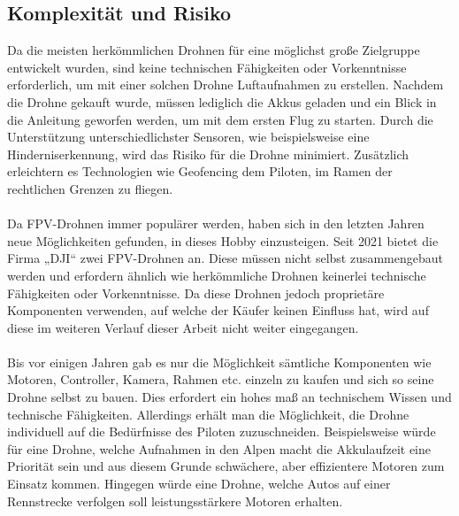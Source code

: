 \subsection[Komplexität und Risiko]{Komplexität und Risiko}
    Da die meisten herkömmlichen Drohnen für eine möglichst große Zielgruppe entwickelt wurden, sind keine technischen Fähigkeiten oder Vorkenntnisse erforderlich, um mit einer solchen Drohne Luftaufnahmen zu erstellen. Nachdem die Drohne gekauft wurde, müssen lediglich die Akkus geladen und ein Blick in die Anleitung geworfen werden, um mit dem ersten Flug zu starten. Durch die Unterstützung unterschiedlichster Sensoren, wie beispielsweise eine Hinderniserkennung, wird das Risiko für die Drohne minimiert. Zusätzlich erleichtern es Technologien wie Geofencing dem Piloten, im Ramen der rechtlichen Grenzen zu fliegen.
    \\ \\
    Da FPV-Drohnen immer populärer werden, haben sich in den letzten Jahren neue Möglichkeiten gefunden, in dieses Hobby einzusteigen. Seit 2021 bietet die Firma „DJI“ zwei FPV-Drohnen an. Diese müssen nicht selbst zusammengebaut werden und erfordern ähnlich wie herkömmliche Drohnen keinerlei technische Fähigkeiten oder Vorkenntnisse. Da diese Drohnen jedoch proprietäre Komponenten verwenden, auf welche der Käufer keinen Einfluss hat, wird auf diese im weiteren Verlauf dieser Arbeit nicht weiter eingegangen.
    \\ \\
    Bis vor einigen Jahren gab es nur die Möglichkeit sämtliche Komponenten wie Motoren, Controller, Kamera, Rahmen etc. einzeln zu kaufen und sich so seine Drohne selbst zu bauen. Dies erfordert ein hohes maß an technischem Wissen und technische Fähigkeiten. Allerdings erhält man die Möglichkeit, die Drohne individuell auf die Bedürfnisse des Piloten zuzuschneiden. Beispielsweise würde für eine Drohne, welche Aufnahmen in den Alpen macht die Akkulaufzeit eine Priorität sein und aus diesem Grunde schwächere, aber effizientere Motoren zum Einsatz kommen. Hingegen würde eine Drohne, welche Autos auf einer Rennstrecke verfolgen soll leistungsstärkere Motoren erhalten.


